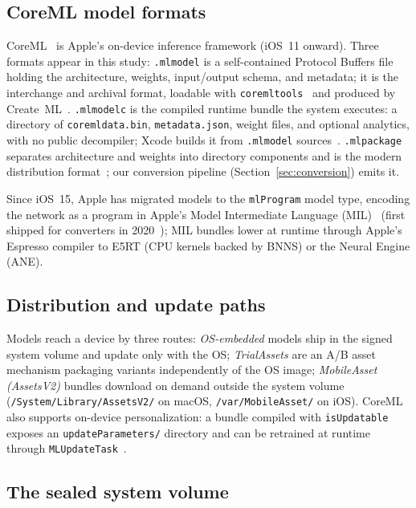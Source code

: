 \documentclass[letterpaper,twocolumn,10pt]{article}
\newcommand{\mlmodel}{\texttt{.mlmodel}\xspace}
\newcommand{\mlmodelc}{\texttt{.mlmodelc}\xspace}
\newcommand{\mlpackage}{\texttt{.mlpackage}\xspace}
\newcommand{\mlprogram}{\texttt{mlProgram}\xspace}
\newcommand{\coremltools}{\texttt{coremltools}\xspace}
\begin{document}
\subsection{CoreML model formats}

CoreML~\cite{apple_coreml} is Apple's on-device inference framework (iOS~11
onward). Three formats appear in this study:
\mlmodel{} is a self-contained Protocol Buffers file holding the
architecture, weights, input/output schema, and metadata; it is the
interchange and archival format, loadable with
\coremltools~\cite{coremltools} and produced by Create~ML~\cite{apple_create_ml}.
\mlmodelc{} is the compiled runtime bundle the system executes: a directory
of \texttt{coremldata.bin}, \texttt{metadata.json}, weight files, and
optional analytics, with no public decompiler; Xcode builds it from
\mlmodel{} sources~\cite{apple_compiling}.
\mlpackage{} separates architecture and weights into directory components
and is the modern distribution format~\cite{wwdc2021_tune}; our conversion
pipeline (Section~\ref{sec:conversion}) emits it.

Since iOS~15, Apple has migrated models to the \mlprogram{} model type,
encoding the network as a program in Apple's Model Intermediate Language
(MIL)~\cite{wwdc2021_tune} (first shipped for converters in
2020~\cite{wwdc2020_coreml}); MIL bundles lower at runtime through Apple's
Espresso compiler to E5RT (CPU kernels backed by BNNS) or the Neural
Engine (ANE).

\subsection{Distribution and update paths}

Models reach a device by three routes: \emph{OS-embedded} models ship in
the signed system volume and update only with the OS; \emph{TrialAssets}
are an A/B asset mechanism packaging variants independently of the OS
image; \emph{MobileAsset (AssetsV2)} bundles download on demand outside the
system volume (\texttt{/System/Library/AssetsV2/} on macOS,
\texttt{/var/MobileAsset/} on iOS). CoreML also supports on-device
personalization: a bundle compiled with \texttt{isUpdatable} exposes an
\texttt{update}\allowbreak\texttt{Parameters/} directory and can be retrained at runtime
through \texttt{MLUpdateTask}~\cite{mlupdatetask}.

\subsection{The sealed system volume}
\end{document}
